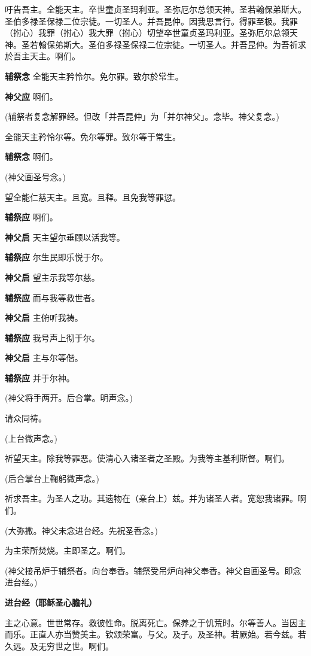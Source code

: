 \documentclass[UTF8,17pt]{ctexart}
\begin{document}
吁告吾主。全能天主。卒世童贞圣玛利亚。圣弥厄尔总领天神。圣若翰保弟斯⼤。圣伯多禄圣保禄⼆位宗徒。⼀切圣⼈。并吾昆仲。因我思⾔⾏。得罪⾄极。我罪（拊⼼）我罪（拊⼼）我⼤罪（拊⼼）切望卒世童贞圣玛利亚。圣弥厄尔总领天神。圣若翰保弟斯⼤。圣伯多禄圣保禄⼆位宗徒。⼀切圣⼈。并吾昆仲。为吾祈求於吾主天主。啊们。

\textbf{辅祭念} \quad 全能天主矜怜尔。免尔罪。致尔於常⽣。

\textbf{神⽗应} \quad 啊们。

(辅祭者复念解罪经。但改「并吾昆仲」为「并尔神⽗」。念毕。神⽗复念。)

全能天主矜怜尔等。免尔等罪。致尔等于常生。

\textbf{辅祭念} \quad 啊们。

(神⽗画圣号念。)

望全能仁慈天主。且宽。且释。且免我等罪愆。

\textbf{辅祭应} \quad 啊们。

\textbf{神父启} \quad 天主望尔垂顾以活我等。

\textbf{辅祭应} \quad 尔生民即乐悦于尔。

\textbf{神父启} \quad 望主示我等尔慈。

\textbf{辅祭应} \quad 而与我等救世者。

\textbf{神父启} \quad 主俯听我祷。

\textbf{辅祭应} \quad 我号声上彻于尔。

\textbf{神父启} \quad 主与尔等偕。

\textbf{辅祭应} \quad 并于尔神。

(神⽗将⼿两开。后合掌。明声念。)

请众同祷。

(上台微声念。)

祈望天主。除我等罪恶。使清⼼⼊诸圣者之圣殿。为我等主基利斯督。啊们。

(后合掌台上鞠躬微声念。)

祈求吾主。为圣⼈之功。其遗物在（亲台上）兹。并为诸圣⼈者。宽恕我诸罪。啊们。

(⼤弥撒。神⽗未念进台经。先祝圣⾹念。)

为主荣所焚烧。主即圣之。啊们。

(神⽗接吊炉于辅祭者。向台奉⾹。辅祭受吊炉向神⽗奉⾹。神⽗⾃画圣号。即念进台经。)

\textbf{进台经（耶稣圣⼼膽礼）}

主之⼼意。世世常存。救彼性命。脱离死亡。保养之于饥荒时。尔等善⼈。当因主⽽乐。正直⼈亦当赞美主。钦颂荣富。与⽗。及⼦。及圣神。若厥始。若今兹。若久远。及⽆穷世之世。啊们。
\end{document}
